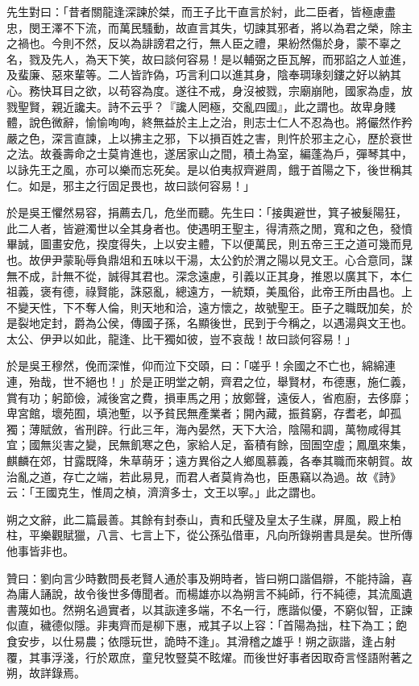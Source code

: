 \begin{pinyinscope}
先生對曰：「昔者關龍逢深諫於桀，而王子比干直言於紂，此二臣者，皆極慮盡忠，閔王澤不下流，而萬民騷動，故直言其失，切諫其邪者，將以為君之榮，除主之禍也。今則不然，反以為誹謗君之行，無人臣之禮，果紛然傷於身，蒙不辜之名，戮及先人，為天下笑，故曰談何容易！是以輔弼之臣瓦解，而邪諂之人並進，及蜚廉、惡來輩等。二人皆詐偽，巧言利口以進其身，陰奉琱瑑刻鏤之好以納其心。務快耳目之欲，以苟容為度。遂往不戒，身沒被戮，宗廟崩阤，國家為虛，放戮聖賢，親近讒夫。詩不云乎？『讒人罔極，交亂四國』，此之謂也。故卑身賤體，說色微辭，愉愉咰咰，終無益於主上之治，則志士仁人不忍為也。將儼然作矜嚴之色，深言直諫，上以拂主之邪，下以損百姓之害，則忤於邪主之心，歷於衰世之法。故養壽命之士莫肯進也，遂居家山之間，積土為室，編蓬為戶，彈琴其中，以詠先王之風，亦可以樂而忘死矣。是以伯夷叔齊避周，餓于首陽之下，後世稱其仁。如是，邪主之行固足畏也，故曰談何容易！」

於是吳王懼然易容，捐薦去几，危坐而聽。先生曰：「接輿避世，箕子被髮陽狂，此二人者，皆避濁世以全其身者也。使遇明王聖主，得清燕之閒，寬和之色，發憤畢誠，圖畫安危，揆度得失，上以安主體，下以便萬民，則五帝三王之道可幾而見也。故伊尹蒙恥辱負鼎俎和五味以干湯，太公釣於渭之陽以見文王。心合意同，謀無不成，計無不從，誠得其君也。深念遠慮，引義以正其身，推恩以廣其下，本仁祖義，褒有德，祿賢能，誅惡亂，總遠方，一統類，美風俗，此帝王所由昌也。上不變天性，下不奪人倫，則天地和洽，遠方懷之，故號聖王。臣子之職既加矣，於是裂地定封，爵為公侯，傳國子孫，名顯後世，民到于今稱之，以遇湯與文王也。太公、伊尹以如此，龍逢、比干獨如彼，豈不哀哉！故曰談何容易！」

於是吳王穆然，俛而深惟，仰而泣下交頤，曰：「嗟乎！余國之不亡也，綿綿連連，殆哉，世不絕也！」於是正明堂之朝，齊君之位，舉賢材，布德惠，施仁義，賞有功；躬節儉，減後宮之費，損車馬之用；放鄭聲，遠佞人，省庖廚，去侈靡；卑宮館，壞苑囿，填池塹，以予貧民無產業者；開內藏，振貧窮，存耆老，卹孤獨；薄賦斂，省刑辟。行此三年，海內晏然，天下大洽，陰陽和調，萬物咸得其宜；國無災害之變，民無飢寒之色，家給人足，畜積有餘，囹圄空虛；鳳凰來集，麒麟在郊，甘露既降，朱草萌牙；遠方異俗之人鄉風慕義，各奉其職而來朝賀。故治亂之道，存亡之端，若此易見，而君人者莫肯為也，臣愚竊以為過。故《詩》云：「王國克生，惟周之楨，濟濟多士，文王以寧。」此之謂也。

朔之文辭，此二篇最善。其餘有封泰山，責和氏璧及皇太子生禖，屏風，殿上柏柱，平樂觀賦獵，八言、七言上下，從公孫弘借車，凡向所錄朔書具是矣。世所傳他事皆非也。

贊曰：劉向言少時數問長老賢人通於事及朔時者，皆曰朔口諧倡辯，不能持論，喜為庸人誦說，故令後世多傳聞者。而楊雄亦以為朔言不純師，行不純德，其流風遺書蔑如也。然朔名過實者，以其詼達多端，不名一行，應諧似優，不窮似智，正諫似直，穢德似隱。非夷齊而是柳下惠，戒其子以上容：「首陽為拙，柱下為工；飽食安步，以仕易農；依隱玩世，詭時不逢」。其滑稽之雄乎！朔之詼諧，逢占射覆，其事浮淺，行於眾庶，童兒牧豎莫不眩燿。而後世好事者因取奇言怪語附著之朔，故詳錄焉。


\end{pinyinscope}